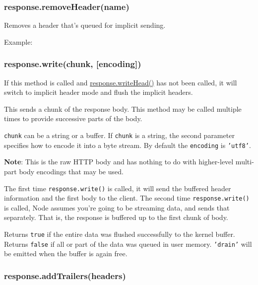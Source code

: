 \subsubsection{response.removeHeader(name)}\label{response.removeheadername}

Removes a header that's queued for implicit sending.

Example:

\begin{Shaded}
\begin{Highlighting}[]
\NormalTok{(}\NormalTok{);}
\end{Highlighting}
\end{Shaded}

\subsubsection{response.write(chunk,
{[}encoding{]})}\label{response.writechunk-encoding}

If this method is called and
\hyperref[httpux5fresponseux5fwriteheadux5fstatuscodeux5freasonphraseux5fheaders]{response.writeHead()}
has not been called, it will switch to implicit header mode and flush
the implicit headers.

This sends a chunk of the response body. This method may be called
multiple times to provide successive parts of the body.

\texttt{chunk} can be a string or a buffer. If \texttt{chunk} is a
string, the second parameter specifies how to encode it into a byte
stream. By default the \texttt{encoding} is \texttt{'utf8'}.

\textbf{Note}: This is the raw HTTP body and has nothing to do with
higher-level multi-part body encodings that may be used.

The first time \texttt{response.write()} is called, it will send the
buffered header information and the first body to the client. The second
time \texttt{response.write()} is called, Node assumes you're going to
be streaming data, and sends that separately. That is, the response is
buffered up to the first chunk of body.

Returns \texttt{true} if the entire data was flushed successfully to the
kernel buffer. Returns \texttt{false} if all or part of the data was
queued in user memory. \texttt{'drain'} will be emitted when the buffer
is again free.

\subsubsection{response.addTrailers(headers)}\label{response.addtrailersheaders}

